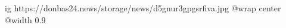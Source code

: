  
 
 
 
 

\ifcmt
  ig https://donbas24.news/storage/news/d5gnur3gpgsrfiva.jpg
  @wrap center
  @width 0.9
\fi
